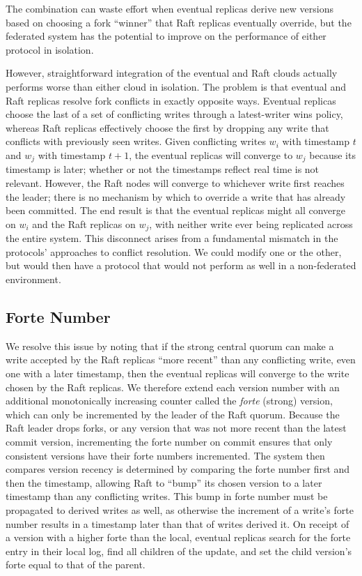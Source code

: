 \documentclass[10pt,conference,letterpaper]{IEEEtran}
\begin{document}
The combination can waste effort when eventual replicas derive new versions based on
choosing a fork ``winner'' that Raft replicas eventually override, but the federated
system has the potential to improve on the performance of either protocol in isolation.

However, straightforward integration of the eventual and Raft clouds actually performs worse
than either cloud in isolation.
The problem is that eventual and Raft replicas resolve fork conflicts in exactly opposite
ways.
Eventual replicas choose the last of a set of conflicting writes through a latest-writer
wins policy, whereas Raft replicas effectively choose the first by dropping any write that
conflicts with previously seen writes.
Given conflicting writes $w_i$ with timestamp $t$ and $w_j$ with timestamp $t+1$, the
eventual replicas will converge to $w_j$ because its timestamp is later; whether or not
the timestamps reflect real time is not relevant.
However, the Raft nodes will converge to whichever write first reaches the leader; there
is no mechanism by which to override a write that has already been committed.
The end result is that the eventual replicas might all converge on $w_i$ and the Raft
replicas on $w_j$, with neither write ever being replicated across the entire system.
This disconnect arises from a fundamental mismatch in the protocols' approaches to
conflict resolution.
We could modify one or the other, but would then have a protocol that would not perform as
well in a non-federated environment.

\subsection{Forte Number}

We resolve this issue by noting that if the strong central quorum can make a write
accepted by the Raft replicas ``more recent'' than any conflicting write, even one with a
later timestamp, then the eventual replicas will converge to the write chosen by the Raft
replicas.
We therefore extend each version number with an additional monotonically increasing
counter called the \textit{forte} (strong) version, which can only be incremented by the
leader of the Raft quorum.
Because the Raft leader drops forks, or any version that was not more recent than the
latest commit version, incrementing the forte number on commit ensures that only
consistent versions have their forte numbers incremented.
The system then compares version recency is determined by comparing the forte number first
and then the timestamp, allowing Raft to ``bump'' its chosen version to a later timestamp
than any conflicting writes.
This bump in forte number must be propagated to derived writes as well, as otherwise the
increment of a write's forte number results in a timestamp later than that of writes
derived it.
On receipt of a version with a higher forte
than the local, eventual replicas search for the forte entry in their local log, find
all children of the update, and set the child version's forte equal to that of the parent.
\end{document}
